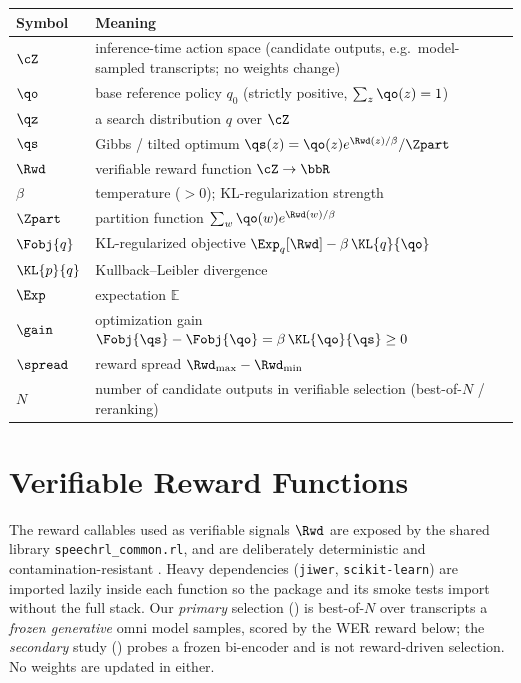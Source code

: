 \begin{center}
\begin{tabular}{ll}
\hline
Symbol & Meaning \\
\hline
$\cZ$ & inference-time action space (candidate outputs, e.g.\ model-sampled transcripts; no weights change) \\
$\qo$ & base reference policy $q_0$ (strictly positive, $\sum_z\qo(z)=1$) \\
$\qz$ & a search distribution $q$ over $\cZ$ \\
$\qs$ & Gibbs / tilted optimum $\qs(z)=\qo(z)e^{\Rwd(z)/\beta}/\Zpart$ \\
$\Rwd$ & verifiable reward function $\cZ\to\bbR$ \\
$\beta$ & temperature ($>0$); KL-regularization strength \\
$\Zpart$ & partition function $\sum_w \qo(w)e^{\Rwd(w)/\beta}$ \\
$\Fobj{q}$ & KL-regularized objective $\Exp_q[\Rwd]-\beta\,\KL{q}{\qo}$ \\
$\KL{p}{q}$ & Kullback--Leibler divergence \\
$\Exp$ & expectation $\mathbb{E}$ \\
$\gain$ & optimization gain $\Fobj{\qs}-\Fobj{\qo}=\beta\,\KL{\qo}{\qs}\ge 0$ \\
$\spread$ & reward spread $\Rwd_{\max}-\Rwd_{\min}$ \\
$N$ & number of candidate outputs in verifiable selection (best-of-$N$ / reranking) \\
\hline
\end{tabular}
\end{center}

\section{Verifiable Reward Functions}
\label{app:rewards}

The reward callables used as verifiable signals $\Rwd$ are exposed by the shared library
\texttt{speechrl\_common.rl}, and are deliberately deterministic and contamination-resistant
\citep{tulu3}. Heavy dependencies (\texttt{jiwer}, \texttt{scikit-learn}) are imported lazily inside
each function so the package and its smoke tests import without the full stack. Our \emph{primary}
selection () is best-of-$N$ over transcripts a \emph{frozen generative} omni model samples,
scored by the WER reward below; the \emph{secondary} study () probes a frozen bi-encoder and
is not reward-driven selection. No weights are updated in either.

